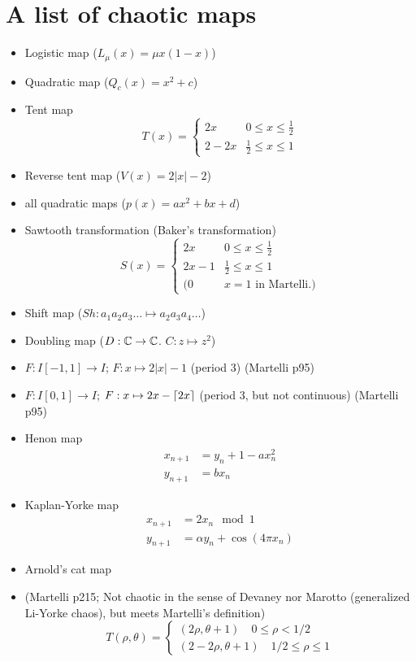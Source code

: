 \documentclass[11pt]{book}
\begin{document}
\section{A list of chaotic maps}
\begin{itemize}
  \item Logistic map ($L_\mu(x) = \mu x(1-x)$)
  \item Quadratic map ($Q_c(x) = x^2 + c$)
  \item Tent map 
    \begin{equation*}
      T(x) = 
      \begin{cases}
        2x & 0 \leq x \leq \frac{1}{2}      \\
        2 - 2x & \frac{1}{2} \leq x \leq 1
      \end{cases}
    \end{equation*}
  \item Reverse tent map ($V(x) = 2|x| - 2$)
  \item all quadratic maps ($p(x) = ax^2 + bx + d$)
  \item Sawtooth transformation (Baker's transformation)
    \begin{equation*}
      S(x) = 
      \begin{cases}
        2x     & 0 \leq x \leq \frac{1}{2}      \\
        2x - 1 & \frac{1}{2} \leq x \leq 1      \\
        (0 & x = 1 \mbox{ in Martelli.})
      \end{cases}
    \end{equation*}
  \item Shift map ($Sh: a_1a_2a_3\ldots \mapsto a_2a_3a_4\ldots$)
  \item Doubling map ($D: \mathbb{C} \to \mathbb{C}$. $C: z \mapsto z^2$)
  \item $F: I [-1,1] \to I$; $F: x \mapsto 2|x| - 1$ (period 3) (Martelli p95)
  \item $F: I [0,1] \to I$; $F: x \mapsto 2x - \lceil2x\rceil$ (period 3, but not continuous) (Martelli p95)
  \item Henon map
    \begin{align*}
      x_{n+1} &= y_n + 1 - ax_n^2 \\
      y_{n+1} &= bx_n
    \end{align*}
  \item Kaplan-Yorke map
    \begin{align*}
      x_{n+1} &= 2x_n \mod 1    \\
      y_{n+1} &= \alpha y_n + \cos(4\pi x_n)
    \end{align*}
  \item Arnold's cat map
  \item (Martelli p215; Not chaotic in the sense of Devaney nor Marotto (generalized Li-Yorke chaos), 
    but meets Martelli's definition)
    \begin{equation*}
      T(\rho, \theta) =
      \begin{cases}
        (2\rho, \theta + 1) \quad 0\leq \rho < 1/2 \\
        (2 - 2\rho, \theta + 1) \quad 1/2 \leq \rho \leq 1
      \end{cases}
    \end{equation*}


\end{itemize}
\end{document}
